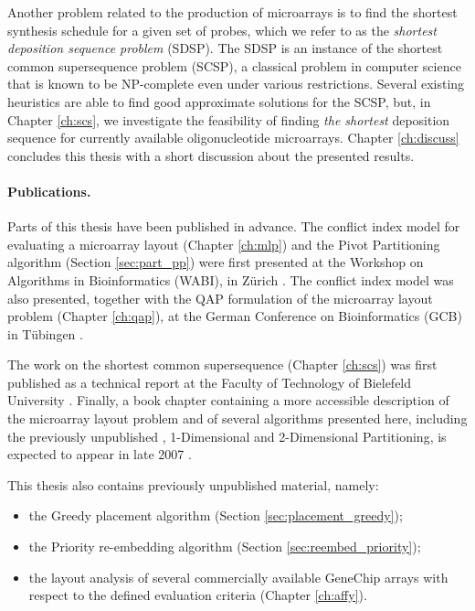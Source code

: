 Another problem related to the production of microarrays is to find the shortest
synthesis schedule for a given set of probes, which we refer to as the
\emph{shortest deposition sequence problem} (SDSP). The SDSP is an instance of
the shortest common supersequence problem (SCSP), a classical problem in
computer science that is known to be NP-complete even under various
restrictions. Several existing heuristics are able to find good approximate
solutions for the SCSP, but, in Chapter \ref{ch:scs}, we investigate the
feasibility of finding \emph{the shortest} deposition sequence for currently
available oligonucleotide microarrays. Chapter \ref{ch:discuss} concludes this
thesis with a short discussion about the presented results.

\paragraph{Publications.}
Parts of this thesis have been published in advance. The conflict index model
for evaluating a microarray layout (Chapter \ref{ch:mlp}) and the Pivot
Partitioning algorithm (Section \ref{sec:part_pp}) were first presented at the
Workshop on Algorithms in Bioinformatics (WABI), in Z\"urich
\citep{Carvalho2006}. The conflict index model was also presented, together with
the QAP formulation of the microarray layout problem (Chapter \ref{ch:qap}), at
the German Conference on Bioinformatics (GCB) in T\"ubingen
\citep{Carvalho2006a}.

The work on the shortest common supersequence (Chapter \ref{ch:scs}) was first
published as a technical report at the Faculty of Technology of Bielefeld
University \citep{Carvalho2005}. Finally, a book chapter containing a more
accessible description of the microarray layout problem and of several
algorithms presented here, including the previously unpublished \Greedyplus,
1-Dimensional and 2-Dimensional Partitioning, is expected to appear in late 2007
\citep{Carvalho2007}.

This thesis also contains previously unpublished material, namely:
\begin{itemize}
\item the Greedy placement algorithm (Section \ref{sec:placement_greedy});
\item the Priority re-embedding algorithm (Section \ref{sec:reembed_priority});
\item the layout analysis of several commercially available GeneChip arrays with
      respect to the defined evaluation criteria (Chapter \ref{ch:affy}).
\end{itemize}

